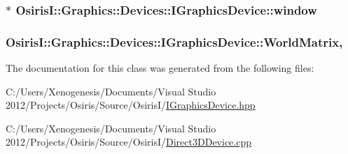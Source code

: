 \hypertarget{class_osiris_i_1_1_graphics_1_1_devices_1_1_i_graphics_device_adf62f71e21b164507688538a266c90ce}{
\subsubsection[{window}]{$\ast$ Osiris\-I\-::\-Graphics\-::\-Devices\-::\-I\-Graphics\-Device\-::window\hspace{0.3cm}{\ttfamily [protected]}}}\label{class_osiris_i_1_1_graphics_1_1_devices_1_1_i_graphics_device_adf62f71e21b164507688538a266c90ce}
\hypertarget{class_osiris_i_1_1_graphics_1_1_devices_1_1_i_graphics_device_a51983451e1c57c60f784ce706e9a9b9e}{
\subsubsection[{World\-Matrix}]{ Osiris\-I\-::\-Graphics\-::\-Devices\-::\-I\-Graphics\-Device\-::\-World\-Matrix\hspace{0.3cm}{\ttfamily [static]}, {\ttfamily [protected]}}}\label{class_osiris_i_1_1_graphics_1_1_devices_1_1_i_graphics_device_a51983451e1c57c60f784ce706e9a9b9e}


The documentation for this class was generated from the following files\-:\begin{DoxyCompactItemize}
\item 
C\-:/\-Users/\-Xenogenesis/\-Documents/\-Visual Studio 2012/\-Projects/\-Osiris/\-Source/\-Osiris\-I/\hyperlink{_i_graphics_device_8hpp}{I\-Graphics\-Device.\-hpp}\item 
C\-:/\-Users/\-Xenogenesis/\-Documents/\-Visual Studio 2012/\-Projects/\-Osiris/\-Source/\-Osiris\-I/\hyperlink{_direct3_d_device_8cpp}{Direct3\-D\-Device.\-cpp}\end{DoxyCompactItemize}
